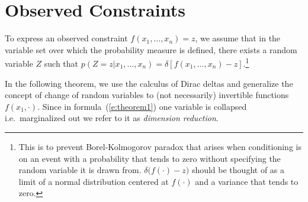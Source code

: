 \documentclass[letterpaper]{article}
\newcommand{\pr}{p}
\begin{document}

\section{Observed Constraints}\label{sect:determinism}

To express an observed constraint $f(x_1, \ldots, x_n) = z$, we assume that
in the variable set over which the probability measure is defined, there exists 
a random variable $Z$ such that $\pr(Z=z | x_1, \ldots, x_n) = \delta[f(x_1, \ldots, x_n) - z]$.\footnote{
This is to prevent Borel-Kolmogorov paradox \cite{kolmogorov1950foundations}
that arises when conditioning is on an event with a probability that tends to zero 
without specifying the random variable it is drawn from. %
$\delta\big( f(\cdot) - z\big)$ should be thought of as a limit of a normal distribution centered at $f(\cdot)$ and a variance that tends to zero.
} 

In the following theorem, we use the calculus of Dirac deltas and generalize the concept of change of random variables to (not necessarily) invertible functions $f(x_1, \cdot)$.
Since in formula~(\ref{e:theorem1}) one variable is collapsed i.e.\ marginalized out we refer to it as \emph{dimension reduction}. 
\end{document}
